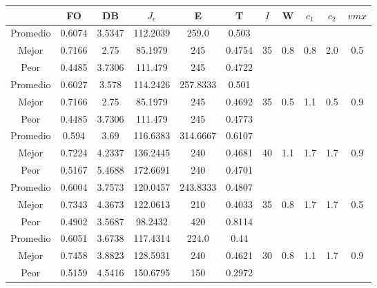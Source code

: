 \begin{table}[h!]
    \footnotesize
    \begin{center}
        \begin{tabular}{|c|c|c|c|c|c|c|c|c|c|c|}
        \hline
            & {\bf FO} & {\bf DB} & $J_e$ & {\bf E} & {\bf T} & $I$ & W & $c_1$ & $c_2$ & $vmx$ \\
        \hline
        \hline
            Promedio  & 0.6074 & 3.5347 & 112.2039 & 259.0 & 0.503 &  &  &  &  & \\
            \cline{1-6}
            Mejor & 0.7166 & 2.75  & 85.1979 & 245 & 0.4754 & 35 & 0.8 & 0.8 & 2.0 & 0.5\\
            \cline{1-6}
            Peor & 0.4485 & 3.7306  & 111.479 & 245 & 0.4722 &  &  &  &  & \\
        \hline
        \hline
            Promedio  & 0.6027 & 3.578 & 114.2426 & 257.8333 & 0.501 &  &  &  &  & \\
            \cline{1-6}
            Mejor & 0.7166 & 2.75  & 85.1979 & 245 & 0.4692 & 35 & 0.5 & 1.1 & 0.5 & 0.9\\
            \cline{1-6}
            Peor & 0.4485 & 3.7306  & 111.479 & 245 & 0.4773 &  &  &  &  & \\
        \hline
        \hline
            Promedio  & 0.594 & 3.69 & 116.6383 & 314.6667 & 0.6107 &  &  &  &  & \\
            \cline{1-6}
            Mejor & 0.7224 & 4.2337  & 136.2445 & 240 & 0.4681 & 40 & 1.1 & 1.7 & 1.7 & 0.9\\
            \cline{1-6}
            Peor & 0.5167 & 5.4688  & 172.6691 & 240 & 0.4701 &  &  &  &  & \\
        \hline
        \hline
            Promedio  & 0.6004 & 3.7573 & 120.0457 & 243.8333 & 0.4807 &  &  &  &  & \\
            \cline{1-6}
            Mejor & 0.7343 & 4.3673  & 122.0613 & 210 & 0.4033 & 35 & 0.8 & 1.7 & 1.7 & 0.5\\
            \cline{1-6}
            Peor & 0.4902 & 3.5687  & 98.2432 & 420 & 0.8114 &  &  &  &  & \\
        \hline
        \hline
            Promedio  & 0.6051 & 3.6738 & 117.4314 & 224.0 & 0.44 &  &  &  &  & \\
            \cline{1-6}
            Mejor & 0.7458 & 3.8823  & 128.5931 & 240 & 0.4621 & 30 & 0.8 & 1.1 & 1.7 & 0.9\\
            \cline{1-6}
            Peor & 0.5159 & 4.5416  & 150.6795 & 150 & 0.2972 &  &  &  &  & \\

\end{tabular}
\end{center}
\end{table}
